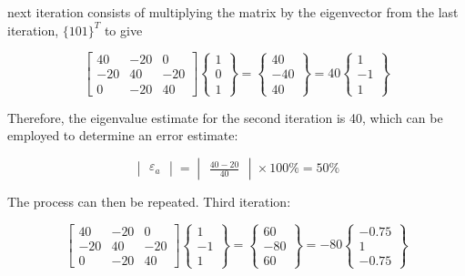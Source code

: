 \documentclass[../main.tex]{subfiles}
\begin{document}
 next iteration consists of multiplying the matrix by the eigenvector from the last iteration, $\{1 0 1\}^{T}$ to give

 \begin{equation}
 \begin{bmatrix}
40 & -20 &0 \\
-20 & 40 & -20\\
0 & -20 & 40
\end{bmatrix}
\begin{Bmatrix}
1\\
0\\
1
\end{Bmatrix}
=\begin{Bmatrix}
40\\
-40\\
40
\end{Bmatrix}=
40\begin{Bmatrix}
1\\
-1\\
1
\end{Bmatrix}
 \end{equation}

Therefore, the eigenvalue estimate for the second iteration is 40, which can be employed to
determine an error estimate:

\begin{equation}
\begin{vmatrix}
\varepsilon _{a}
\end{vmatrix}
=\begin{vmatrix}
\frac{40-20}{40}
\end{vmatrix}\times 100\%=50\%
\end{equation}

The process can then be repeated.
Third iteration:

\begin{equation}
\begin{bmatrix}
40 & -20 &0 \\
-20 & 40 & -20\\
0 & -20 & 40
\end{bmatrix}\begin{Bmatrix}
1\\
-1\\
1
\end{Bmatrix}=\begin{Bmatrix}
60\\
-80\\
60
\end{Bmatrix}=-80\begin{Bmatrix}
-0.75\\
1\\
-0.75
\end{Bmatrix}
\end{equation}
\end{document}
